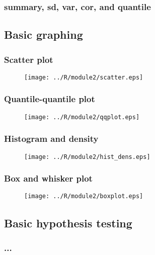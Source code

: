 \documentclass{beamer}
\begin{document}
\begin{frame}[fragile]
    \frametitle{summary, sd, var, cor, and quantile}
    
\end{frame}


\subsection{Basic graphing}

\begin{frame}[fragile]
    \frametitle{Scatter plot}
    \fontsize{9}{11}\selectfont
    \begin{figure}[b]
      \centering
      \texttt{[image: ../R/module2/scatter.eps]}
    \end{figure}
\end{frame}


\begin{frame}[fragile]
    \frametitle{Quantile-quantile plot}
    \begin{figure}[b]
      \centering
      \texttt{[image: ../R/module2/qqplot.eps]}
    \end{figure}
\end{frame}


\begin{frame}[fragile]
    \frametitle{Histogram and density}
    \begin{figure}[b]
      \centering
      \texttt{[image: ../R/module2/hist\_dens.eps]}
    \end{figure}
\end{frame}


\begin{frame}[fragile]
    \frametitle{Box and whisker plot}
    \begin{figure}[b]
      \centering
      \texttt{[image: ../R/module2/boxplot.eps]}
    \end{figure}
\end{frame}


\subsection{Basic hypothesis testing}

\begin{frame}[fragile]
    \frametitle{...}
\end{frame}
\end{document}

